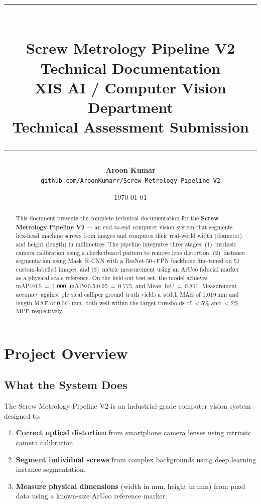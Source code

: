\documentclass[12pt, a4paper, twoside]{report}
\title{
    \vspace{-2cm}
    \textcolor{xisblue}{\rule{\linewidth}{2pt}}\\[0.8cm]
    {\Huge\bfseries Screw Metrology Pipeline V2}\\[0.4cm]
    {\Large Technical Documentation}\\[0.3cm]
    {\large XIS AI / Computer Vision Department}\\[0.3cm]
    {\large Technical Assessment Submission}\\[0.5cm]
    \textcolor{xisblue}{\rule{\linewidth}{2pt}}
}
\author{
    \textbf{Aroon Kumar}\\[0.2cm]
    \texttt{github.com/AroonKumarr/Screw-Metrology-Pipeline-V2}
}
\date{\today}
\begin{document}
\maketitle
\thispagestyle{empty}

\begin{abstract}
\noindent
This document presents the complete technical documentation for the \textbf{Screw Metrology Pipeline V2} --- an end-to-end computer vision system that segments hex-head machine screws from images and computes their real-world width (diameter) and height (length) in millimetres. The pipeline integrates three stages: (1)~intrinsic camera calibration using a checkerboard pattern to remove lens distortion, (2)~instance segmentation using Mask~R-CNN with a ResNet-50+FPN backbone fine-tuned on 51 custom-labelled images, and (3)~metric measurement using an ArUco fiducial marker as a physical scale reference. On the held-out test set, the model achieves mAP@0.5~=~1.000, mAP@0.5:0.95~=~0.775, and Mean~IoU~=~0.861. Measurement accuracy against physical calliper ground truth yields a width MAE of 0.019\,mm and length MAE of 0.067\,mm, both well within the target thresholds of $<5\%$ and $<2\%$ MPE respectively.
\end{abstract}

\tableofcontents
\listoffigures
\listoftables

\chapter{Project Overview}
\label{ch:overview}

\section{What the System Does}
The Screw Metrology Pipeline V2 is an industrial-grade computer vision system designed to:
\begin{enumerate}
    \item \textbf{Correct optical distortion} from smartphone camera lenses using intrinsic camera calibration.
    \item \textbf{Segment individual screws} from complex backgrounds using deep learning instance segmentation.
    \item \textbf{Measure physical dimensions} (width in mm, height in mm) from pixel data using a known-size ArUco reference marker.
\end{enumerate}
\end{document}
